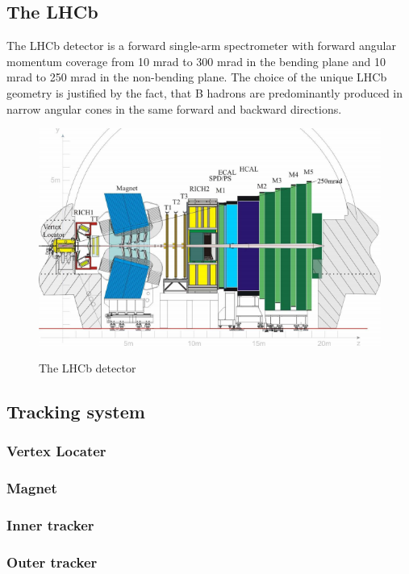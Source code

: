 \subsection{The LHCb}
The LHCb detector is a forward single-arm spectrometer with forward angular
momentum coverage from 10 mrad to 300 mrad in the bending plane and 10 mrad to
250 mrad in the non-bending plane. The choice of the unique LHCb geometry is
justified by the fact, that B hadrons are predominantly produced in narrow
angular cones in the same forward and backward directions.

\begin{figure}[H]
\includegraphics[width=\textwidth]{figs/lhcb.png}
\label{fig_lhc}
\caption{The LHCb detector}
\end{figure}

\subsection{Tracking system}
\subsubsection{Vertex Locater}
\subsubsection{Magnet}
\subsubsection{Inner tracker}
\subsubsection{Outer tracker}

